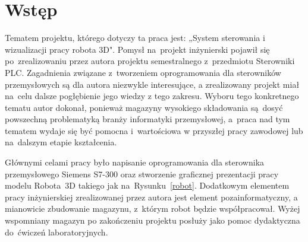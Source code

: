 \section{Wstęp}

Tematem projektu, którego dotyczy ta praca jest: „System sterowania i wizualizacji pracy robota 3D". Pomysł na~projekt inżynierski pojawił się po~zrealizowaniu przez autora projektu semestralnego z~przedmiotu Sterowniki PLC. Zagadnienia związane z~tworzeniem oprogramowania dla sterowników przemysłowych są dla autora niezwykle interesujące, a zrealizowany projekt miał na~celu dalsze pogłębienie jego wiedzy z tego zakresu. Wyboru tego konkretnego tematu autor dokonał, ponieważ magazyny wysokiego składowania są~dosyć powszechną problematyką branży informatyki przemysłowej, a~praca nad tym tematem wydaje się być pomocna i~wartościowa w przyszłej pracy zawodowej lub na~dalszym etapie kształcenia.

Głównymi celami pracy było napisanie oprogramowania dla sterownika przemysłowego Siemens S7-300 oraz stworzenie graficznej prezentacji pracy modelu Robota~3D takiego jak na~Rysunku~\ref{robot}.
Dodatkowym elementem pracy inżynierskiej zrealizowanej przez autora jest element pozainformatyczny, a mianowicie zbudowanie magazynu, z~którym robot będzie współpracował. Wyżej wspomniany magazyn po zakończeniu projektu posłuży jako pomoc dydaktyczna do~ćwiczeń laboratoryjnych.

